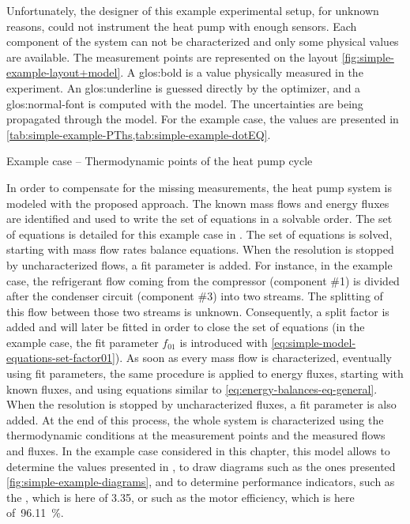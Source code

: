 Unfortunately, the designer of this example experimental setup, for
unknown reasons, could not instrument the heat pump with enough
sensors. Each component of the system can not be characterized and
only some physical values are available. The measurement points are
represented on the layout \cref{fig:simple-example-layout+model}. A
\gls{glos:bold} is a value physically measured in the experiment. An
\gls{glos:underline} is guessed directly by the optimizer, and a
\gls{glos:normal-font} is computed with the model. The uncertainties are
being propagated through the model. For the example case, the values are presented in
\cref{tab:simple-example-PThs,tab:simple-example-dotEQ}.

\begin{table}[ht!]
  \footnotesize
  \begin{center}
    
  \end{center}
  \caption{Example case -- Thermodynamic points of the heat pump cycle}
  \label{tab:simple-example-PThs}
\end{table}

In order to compensate for the missing measurements, the heat pump
system is modeled with the proposed approach. The known mass flows and
energy fluxes are identified and used to write the set of equations in
a solvable order. The set of equations is detailed for this example
case in . The set of equations
is solved, starting with mass flow rates balance equations. When the
resolution is stopped by uncharacterized flows, a fit parameter is
added. For instance, in the example case, the refrigerant flow coming
from the compressor (component \#1) is divided after the condenser
circuit (component \#3) into two streams. The splitting of this flow
between those two streams is unknown. Consequently, a split factor is
added and will later be fitted in order to close the set of equations
(in the example case, the fit parameter $f_{01}$ is introduced
with \cref{eq:simple-model-equations-set-factor01}). As soon as every
mass flow is characterized, eventually using fit parameters, the same
procedure is applied to energy fluxes, starting with known fluxes, and
using equations similar to \cref{eq:energy-balances-eq-general}. When
the resolution is stopped by uncharacterized fluxes, a fit parameter
is also added. At the end of this process, the whole system is
characterized using the thermodynamic conditions at the measurement
points and the measured flows and fluxes. In the example case
considered in this chapter, this model allows to determine the values
presented in
, to draw
diagrams such as the ones presented
\cref{fig:simple-example-diagrams}, and to determine performance
indicators, such as the \COP{}, which is here of 3.35, or such as the
motor efficiency, which is here of~\SI{96.11}{\%}.

